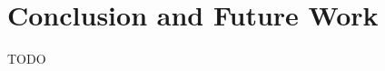 \documentclass[12pt]{article}
\begin{document}
	\section{Conclusion and Future Work}
	TODO

\end{document}
